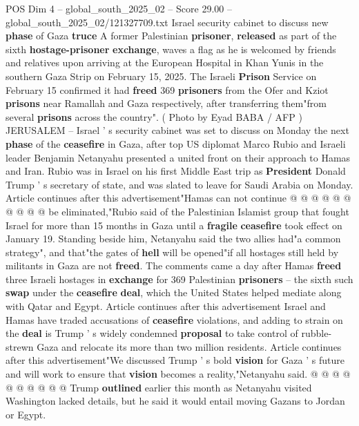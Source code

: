 \begin{textsample}{POS Dim 4 – global\_south\_2025\_02 – Score 29.00 – global\_south\_2025\_02/121327709.txt}  \label{ex:f4_pos_024}
Israel security cabinet to discuss new \textbf{phase} of Gaza \textbf{truce} A former Palestinian \textbf{prisoner}, \textbf{released} as part of the sixth \textbf{hostage-prisoner} \textbf{exchange}, waves a flag as he is welcomed by friends and relatives upon arriving at the European Hospital in Khan Yunis in the southern Gaza Strip on February 15, 2025.
The Israeli \textbf{Prison} Service on February 15 confirmed it had \textbf{freed} 369 \textbf{prisoners} from the Ofer and Kziot \textbf{prisons} near Ramallah and Gaza respectively, after transferring them"from several \textbf{prisons} across the country". ( Photo by Eyad BABA / AFP ) JERUSALEM -- Israel ' s security cabinet was set to discuss on Monday the next \textbf{phase} of the \textbf{ceasefire} in Gaza, after top US diplomat Marco Rubio and Israeli leader Benjamin Netanyahu presented a united front on their approach to Hamas and Iran.
Rubio was in Israel on his first Middle East trip as \textbf{President} Donald Trump ' s secretary of state, and was slated to leave for Saudi Arabia on Monday.
Article continues after this advertisement"Hamas can not continue @ @ @ @ @ @ @ @ @ @ be eliminated,"Rubio said of the Palestinian Islamist group that fought Israel for more than 15 months in Gaza until a \textbf{fragile} \textbf{ceasefire} took effect on January 19.
Standing beside him, Netanyahu said the two allies had"a common strategy", and that"the gates of \textbf{hell} will be opened"if all hostages still held by militants in Gaza are not \textbf{freed}.
The comments came a day after Hamas \textbf{freed} three Israeli hostages in \textbf{exchange} for 369 Palestinian \textbf{prisoners} -- the sixth such \textbf{swap} under the \textbf{ceasefire} \textbf{deal}, which the United States helped mediate along with Qatar and Egypt.
Article continues after this advertisement Israel and Hamas have traded accusations of \textbf{ceasefire} violations, and adding to strain on the \textbf{deal} is Trump ' s widely condemned \textbf{proposal} to take control of rubble-strewn Gaza and relocate its more than two million residents.
Article continues after this advertisement"We discussed Trump ' s bold \textbf{vision} for Gaza ' s future and will work to ensure that \textbf{vision} becomes a reality,"Netanyahu said. @ @ @ @ @ @ @ @ @ @ Trump \textbf{outlined} earlier this month as Netanyahu visited Washington lacked details, but he said it would entail moving Gazans to Jordan or Egypt.

\end{textsample}
